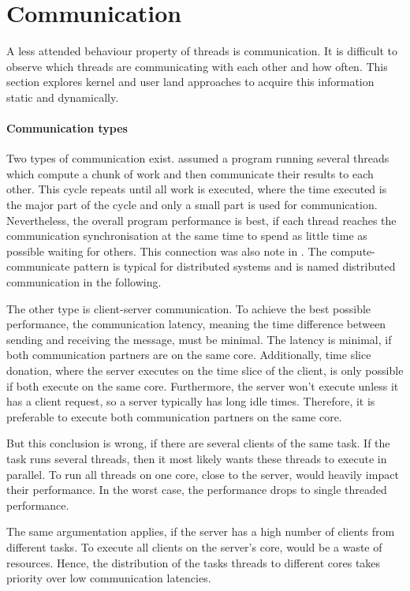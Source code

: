 \section{Communication}
\label{design:comm}

A less attended behaviour property of threads is communication.
It is difficult to observe which threads are communicating with each other and
how often.
This section explores kernel and user land approaches to acquire this
information static and dynamically.


\paragraph{Communication types}
Two types of communication exist.
\citeauthor{hofmeyr_load_2010} assumed a program running several threads which
compute a chunk of work and then communicate their results to each other.
This cycle repeats until all work is executed, where the time executed is the
major part of the cycle and only a small part is used for communication.
Nevertheless, the overall program performance is best, if each thread reaches
the communication synchronisation at the same time to spend as little time as
possible waiting for others.
This connection was also note in \cite{hofmeyr_load_2010}.
The compute-communicate pattern is typical for distributed systems and is named
distributed communication in the following.

The other type is client-server communication.
To achieve the best possible performance, the communication latency, meaning
the time difference between sending and receiving the message, must be minimal.
The latency is minimal, if both communication partners are on the same core.
Additionally, time slice donation, where the server executes on the time slice
of the client, is only possible if both execute on the same core.
Furthermore, the server won't execute unless it has a client request, so a
server typically has long idle times.
Therefore, it is preferable to execute both communication partners on the same
core.

But this conclusion is wrong, if there are several clients of the same task.
If the task runs several threads, then it most likely wants these threads to
execute in parallel.
To run all threads on one core, close to the server, would heavily impact their
performance.
In the worst case, the performance drops to single threaded performance.

The same argumentation applies, if the server has a high number of clients from
different tasks.
To execute all clients on the server's core, would be a waste of resources.
Hence, the distribution of the tasks threads to different cores takes priority
over low communication latencies.


